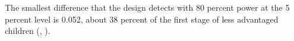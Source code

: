 The smallest difference that the design detects with 80 percent power at the 5 percent level is 0.052, about 38 percent of the first stage of less advantaged children (, ).%
